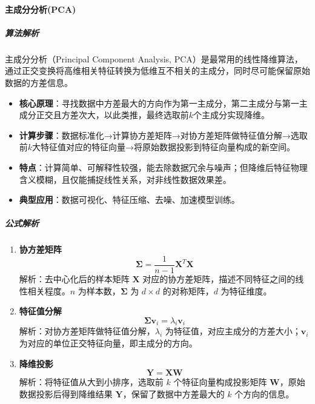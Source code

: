 \documentclass[12pt]{article}
\begin{document}
\paragraph{主成分分析(PCA)}
\subparagraph{算法解析}
主成分分析（Principal Component Analysis, PCA）是最常用的线性降维算法，通过正交变换将高维相关特征转换为低维互不相关的主成分，同时尽可能保留原始数据的方差信息。
\begin{itemize}
    \item \textbf{核心原理}：寻找数据中方差最大的方向作为第一主成分，第二主成分与第一主成分正交且方差次大，以此类推，最终选取前$k$个主成分实现降维。
    \item \textbf{计算步骤}：数据标准化→计算协方差矩阵→对协方差矩阵做特征值分解→选取前$k$大特征值对应的特征向量→将原始数据投影到特征向量构成的新空间。
    \item \textbf{特点}：计算简单、可解释性较强，能去除数据冗余与噪声；但降维后特征物理含义模糊，且仅能捕捉线性关系，对非线性数据效果差。
    \item \textbf{典型应用}：数据可视化、特征压缩、去噪、加速模型训练。
\end{itemize}

\subparagraph{公式解析}
\begin{enumerate}
    \item \textbf{协方差矩阵}
    \[
    \boldsymbol{\Sigma} = \frac{1}{n-1} \boldsymbol{X}^T \boldsymbol{X}
    \]
    解析：去中心化后的样本矩阵 $\boldsymbol{X}$ 对应的协方差矩阵，描述不同特征之间的线性相关程度。$n$ 为样本数，$\boldsymbol{\Sigma}$ 为 $d\times d$ 的对称矩阵，$d$ 为特征维度。

    \item \textbf{特征值分解}
    \[
    \boldsymbol{\Sigma} \boldsymbol{v}_i = \lambda_i \boldsymbol{v}_i
    \]
    解析：对协方差矩阵做特征值分解，$\lambda_i$ 为特征值，对应主成分的方差大小；$\boldsymbol{v}_i$ 为对应的单位正交特征向量，即主成分的方向。

    \item \textbf{降维投影}
    \[
    \boldsymbol{Y} = \boldsymbol{X} \boldsymbol{W}
    \]
    解析：将特征值从大到小排序，选取前 $k$ 个特征向量构成投影矩阵 $\boldsymbol{W}$，原始数据投影后得到降维结果 $\boldsymbol{Y}$，保留了数据中方差最大的 $k$ 个方向的信息。
\end{enumerate}
\end{document}
